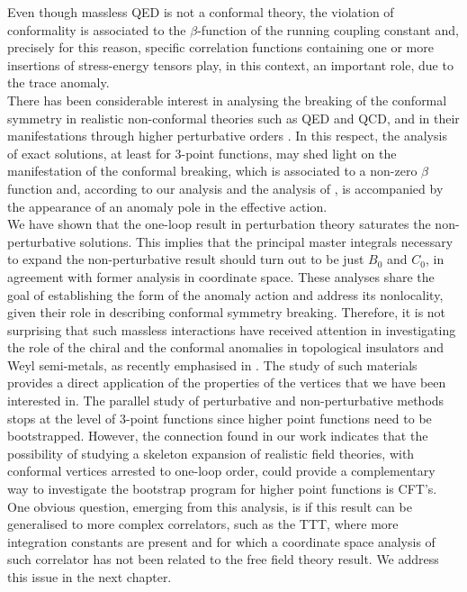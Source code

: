 \documentclass[a4paper,11pt,openright,twoside]{book}
\numberwithin{equation}{section}
\begin{document}
{{Even though massless QED is not a conformal theory, the violation of conformality is associated to the $\beta$-function of the running coupling constant and, precisely for this reason, specific correlation functions containing one or more insertions of stress-energy tensors play, in this context, an important role, due to the trace anomaly. \\
There has been considerable interest in analysing the breaking of the conformal symmetry in realistic non-conformal theories such as QED and QCD, and in their manifestations through higher perturbative orders \cite{Kataev:1996ce,Broadhurst:1993ru}. In this respect, the analysis of exact solutions, at least for 3-point functions, may shed light on the manifestation of the conformal breaking, which is associated to a non-zero $\beta$ function and, according to our analysis and the analysis of \cite{Giannotti:2008cv,2009PhLB..682..322A,Armillis:2009pq}, is accompanied by the appearance of an anomaly pole in the effective action.\\
We have shown that the one-loop result in perturbation theory saturates the non-perturbative solutions. This implies that the principal master integrals necessary to expand the non-perturbative result should turn out to be just $B_0$ and $C_0$, in agreement with former analysis in coordinate space. These analyses share the goal of establishing the form of the anomaly action and address its nonlocality, given their role in describing conformal symmetry breaking. Therefore, it is not surprising that such massless interactions have received attention in investigating the role of the chiral and the conformal anomalies in topological insulators and Weyl semi-metals, as recently emphasised in \cite{Chernodub:2017jcp,Rinkel:2016dxo}. 
The study of such materials provides a direct application of the properties of the vertices that we have been interested in.
The parallel study of perturbative and non-perturbative methods stops at the level of 3-point functions since higher point functions need to be bootstrapped. However, the connection found in our work indicates that the possibility of studying a skeleton expansion of realistic field theories, with conformal vertices arrested to one-loop order,  
could provide a complementary way to investigate the bootstrap program for higher point functions is CFT's.\\
One obvious question, emerging from this analysis, is if this result can be generalised to more complex correlators, such as the TTT, where more integration constants are present and for which a coordinate space analysis of such correlator has not been related to the free field theory result. We address this issue in the next chapter.

}}
\end{document}

